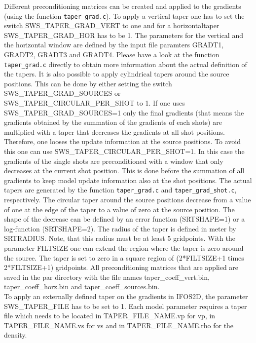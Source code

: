 Different preconditioning matrices can be created and applied to the gradients (using the function \texttt{taper\_grad.c}). To apply a vertical taper one has to set the switch SWS\_TAPER\_GRAD\_VERT to one and for a horizontaltaper SWS\_TAPER\_GRAD\_HOR has to be 1. The parameters for the vertical and the horizontal window are defined by the input file paramters GRADT1, GRADT2, GRADT3 and GRADT4. Please have a look at the function \texttt{taper\_grad.c} directly to obtain more information about the actual definition of the tapers. It is also possible to apply cylindrical tapers around the source positions. This can be done by either setting the switch SWS\_TAPER\_GRAD\_SOURCES or SWS\_TAPER\_CIRCULAR\_PER\_SHOT to 1. If one uses SWS\_TAPER\_GRAD\_SOURCES=1 only the final gradients (that means the gradients obtained by the summation of the gradients of each shots) are multiplied with a taper that decreases the gradients at all shot positions. Therefore, one looses the update information at the source positions. To avoid this one can use SWS\_TAPER\_CIRCULAR\_PER\_SHOT=1. In this case the gradients of the single shots are preconditioned with a window that only decreases at the current shot position. This is done before the summation of all gradients to keep model update information also at the shot positions. The actual tapers are generated by the function \texttt{taper\_grad.c} and \texttt{taper\_grad\_shot.c}, respectively. The circular taper around the source positions decrease from a value of one at the edge of the taper to a value of zero at the source position. The shape of the decrease can be defined by an error function (SRTSHAPE=1) or a log-function (SRTSHAPE=2). The radius of the taper is defined in meter by SRTRADIUS. Note, that this radius must be at least 5 gridpoints. With the parameter FILTSIZE one can extend the region where the taper is zero around the source. The taper is set to zero in a square region of (2*FILTSIZE+1 times 2*FILTSIZE+1) gridpoints. All preconditioning matrices that are applied are saved in the par directory with the file names taper\_coeff\_vert.bin, taper\_coeff\_horz.bin and taper\_coeff\_sources.bin.\\

To apply an externally defined taper on the gradients in IFOS2D, the parameter SWS\_TAPER\_FILE has to be set to 1. Each model parameter requires a taper file which needs to be located in TAPER\_FILE\_NAME.vp for vp, in TAPER\_FILE\_NAME.vs for vs and in TAPER\_FILE\_NAME.rho for the density.\\

